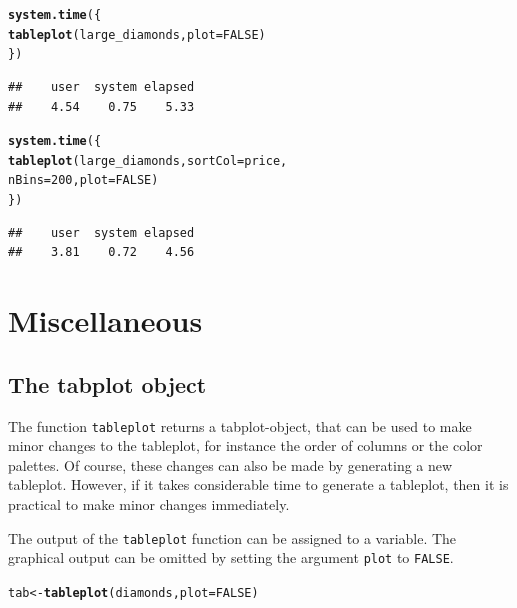 \documentclass[11pt, fleqn, a4paper]{article}\usepackage[]{graphicx}\usepackage[]{color}
\makeatletter
\newcommand{\hlnum}[1]{\textcolor[rgb]{0.686,0.059,0.569}{#1}}%
\newcommand{\hlstd}[1]{\textcolor[rgb]{0.345,0.345,0.345}{#1}}%
\newcommand{\hlkwb}[1]{\textcolor[rgb]{0.69,0.353,0.396}{#1}}%
\newcommand{\hlkwc}[1]{\textcolor[rgb]{0.333,0.667,0.333}{#1}}%
\newcommand{\hlkwd}[1]{\textcolor[rgb]{0.737,0.353,0.396}{\textbf{#1}}}%
\newenvironment{kframe}{%
 \def\at@end@of@kframe{}%
 \ifinner\ifhmode%
  \def\at@end@of@kframe{\end{minipage}}%
  \begin{minipage}{\columnwidth}%
 \fi\fi%
 \def\FrameCommand##1{\hskip\@totalleftmargin \hskip-\fboxsep
 \colorbox{shadecolor}{##1}\hskip-\fboxsep
     \hskip-\linewidth \hskip-\@totalleftmargin \hskip\columnwidth}%
 \MakeFramed {\advance\hsize-\width
   \@totalleftmargin\z@ \linewidth\hsize
   \@setminipage}}%
 {\par\unskip\endMakeFramed%
 \at@end@of@kframe}
\newenvironment{knitrout}{}{} %
\makeatother
\begin{document}
\begin{knitrout}
\color{fgcolor}\begin{kframe}
\begin{alltt}
\hlkwd{system.time}\hlstd{(\{}
    \hlkwd{tableplot}\hlstd{(large_diamonds,} \hlkwc{plot} \hlstd{=} \hlnum{FALSE}\hlstd{)}
\hlstd{\})}
\end{alltt}
\begin{verbatim}
##    user  system elapsed 
##    4.54    0.75    5.33
\end{verbatim}
\begin{alltt}
\hlkwd{system.time}\hlstd{(\{}
    \hlkwd{tableplot}\hlstd{(large_diamonds,} \hlkwc{sortCol} \hlstd{= price,}
        \hlkwc{nBins} \hlstd{=} \hlnum{200}\hlstd{,} \hlkwc{plot} \hlstd{=} \hlnum{FALSE}\hlstd{)}
\hlstd{\})}
\end{alltt}
\begin{verbatim}
##    user  system elapsed 
##    3.81    0.72    4.56
\end{verbatim}
\end{kframe}
\end{knitrout}



\section{Miscellaneous}

\subsection{The tabplot object}\label{sectab}

The function {\tt tableplot} returns a tabplot-object, that can be used to make minor changes to the tableplot, for instance the order of columns or the color palettes. Of course, these changes can also be made by generating a new tableplot. However, if it takes considerable time to generate a tableplot, then it is practical to make minor changes immediately.

The output of the {\tt tableplot} function can be assigned to a variable. The graphical output can be omitted by setting the argument {\tt plot} to {\tt FALSE}.

\begin{knitrout}
\color{fgcolor}\begin{kframe}
\begin{alltt}
\hlstd{tab} \hlkwb{<-} \hlkwd{tableplot}\hlstd{(diamonds,} \hlkwc{plot} \hlstd{=} \hlnum{FALSE}\hlstd{)}
\end{alltt}
\end{kframe}
\end{knitrout}
\end{document}
